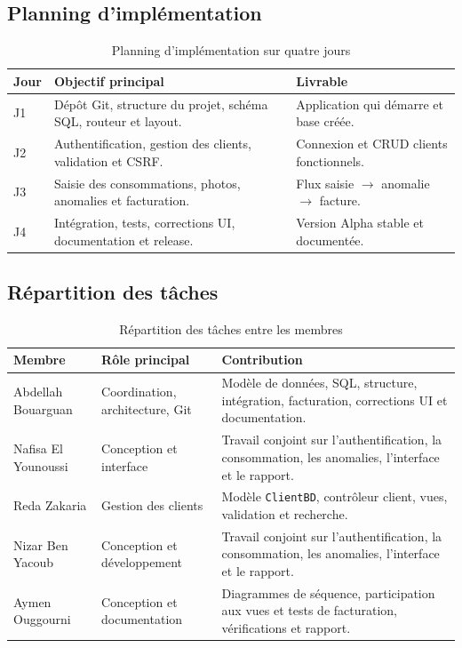 \subsection{Planning d'implémentation}

\begin{table}[H]
\centering
\caption{Planning d'implémentation sur quatre jours}
\label{tab:planning}
\small
\begin{tabular}{p{}p{}p{}}
\toprule
\textbf{Jour} & \textbf{Objectif principal} & \textbf{Livrable} \\
\midrule
J1 & Dépôt Git, structure du projet, schéma SQL, routeur et layout. & Application qui démarre et base créée. \\
J2 & Authentification, gestion des clients, validation et CSRF. & Connexion et CRUD clients fonctionnels. \\
J3 & Saisie des consommations, photos, anomalies et facturation. & Flux saisie $\rightarrow$ anomalie $\rightarrow$ facture. \\
J4 & Intégration, tests, corrections UI, documentation et release. & Version Alpha stable et documentée. \\
\bottomrule
\end{tabular}
\end{table}

\subsection{Répartition des tâches}

\begin{table}[H]
\centering
\caption{Répartition des tâches entre les membres}
\label{tab:taches}
\small
\begin{tabular}{p{}p{}p{}}
\toprule
\textbf{Membre} & \textbf{Rôle principal} & \textbf{Contribution} \\
\midrule
Abdellah Bouarguan & Coordination, architecture, Git & Modèle de données, SQL, structure, intégration, facturation, corrections UI et documentation. \\
Nafisa El Younoussi & Conception et interface & Travail conjoint sur l'authentification, la consommation, les anomalies, l'interface et le rapport. \\
Reda Zakaria & Gestion des clients & Modèle \texttt{ClientBD}, contrôleur client, vues, validation et recherche. \\
Nizar Ben Yacoub & Conception et développement & Travail conjoint sur l'authentification, la consommation, les anomalies, l'interface et le rapport. \\
Aymen Ouggourni & Conception et documentation & Diagrammes de séquence, participation aux vues et tests de facturation, vérifications et rapport. \\
\bottomrule
\end{tabular}
\end{table}
